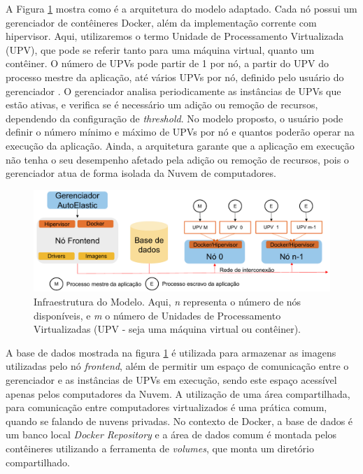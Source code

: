 \documentclass[twoside,english,brazilian]{UNISINOSartigo}
\begin{document}
A Figura \ref{fig:arquitetura} mostra como é a arquitetura do modelo adaptado. Cada nó possui um gerenciador de contêineres Docker, além da implementação corrente com hipervisor. Aqui, utilizaremos o termo Unidade de Processamento Virtualizada (UPV), que pode se referir tanto para uma máquina virtual, quanto um contêiner. O número de UPVs pode partir de 1 por nó, a partir do UPV do processo mestre da aplicação, até vários UPVs por nó, definido pelo usuário do gerenciador \cite{6307065}. O gerenciador analisa periodicamente as instâncias de UPVs que estão ativas, e verifica se é necessário um adição ou remoção de recursos, dependendo da configuração de \textit{threshold}. No modelo proposto, o usuário pode definir o número mínimo e máximo de UPVs por nó e quantos poderão operar na execução da aplicação. Ainda, a arquitetura garante que a aplicação em execução não tenha o seu desempenho afetado pela adição ou remoção de recursos, pois o gerenciador atua de forma isolada da Nuvem de computadores. 
\begin{figure}[ht!]
	\caption{Infraestrutura do Modelo. Aqui, \textit{n} representa o número de nós disponíveis, e \textit{m} o número de Unidades de Processamento Virtualizadas (UPV - seja uma máquina virtual ou contêiner).}
	\label{fig:arquitetura}
	\centering%
	\begin{minipage}{0.8\textwidth}
		\includegraphics[width=\textwidth]{images/arquitetura}
	\end{minipage}
\end{figure}
A base de dados mostrada na figura \ref{fig:arquitetura} é utilizada para armazenar as imagens utilizadas pelo nó \textit{frontend}, além de permitir um espaço de comunicação entre o gerenciador e as instâncias de UPVs em execução, sendo este espaço acessível apenas pelos computadores da Nuvem. A utilização de uma área compartilhada, para comunicação entre computadores virtualizados é uma prática comum, quando se falando de nuvens privadas. No contexto de Docker, a base de dados é um banco local \textit{Docker Repository} e a área de dados comum é montada pelos contêineres utilizando a ferramenta de \textit{volumes}, que monta um diretório compartilhado.
\end{document}

